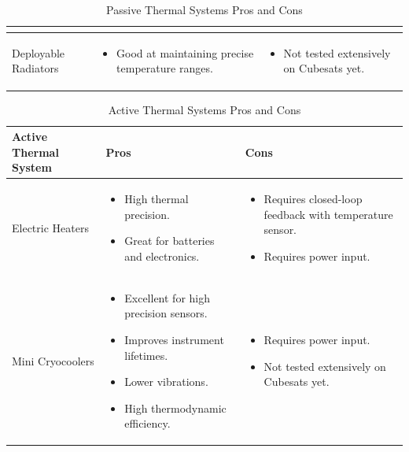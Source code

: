 \begin{table}[H]
\begin{tabular}{|p{}|p{}|p{}|}
\begin{itemize}
    \end{itemize}
    \\
\hline
    Deployable Radiators
    &
    \begin{itemize}
        \item Good at maintaining precise temperature ranges.
    \end{itemize}
    &
    \begin{itemize}
        \item Not tested extensively on Cubesats yet.
    \end{itemize}
    \\
\hline
\end{tabular}
\caption{Passive Thermal Systems Pros and Cons}
\label{tbl:Passive_Thermal_ProCon}
\end{table}

\begin{table}[H]
\centering
\begin{tabular}{|p{}|p{}|p{}|} 
\hline
\textbf{Active Thermal System} & \textbf{Pros} & \textbf{Cons}
\\
\hline
     Electric Heaters
     &
    \begin{itemize}
        \item High thermal precision.
        \item Great for batteries and electronics.
    \end{itemize}
    &
    \begin{itemize}
        \item Requires closed-loop feedback with temperature sensor.
        \item Requires power input.
    \end{itemize}
    \\
\hline
     Mini Cryocoolers
     &
    \begin{itemize}
        \item Excellent for high precision sensors.
        \item Improves instrument lifetimes.
        \item Lower vibrations.
        \item High thermodynamic efficiency.
    \end{itemize}
    &
        \begin{itemize}
        \item Requires power input.
        \item Not tested extensively on Cubesats yet.
    \end{itemize}
    \\
\hline
\end{tabular}
\caption{Active Thermal Systems Pros and Cons}
\label{tbl:Active_Thermal_ProCon}
\end{table}


